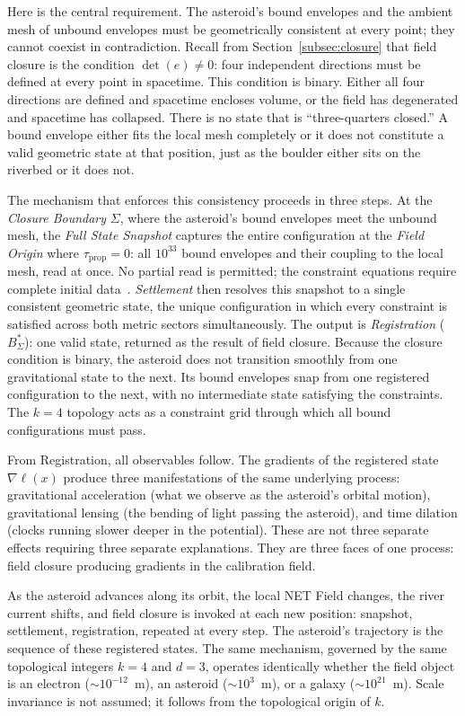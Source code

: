\documentclass[aps,prd,preprint,superscriptaddress,showpacs,preprintnumbers,amsmath,amssymb,nofootinbib]{revtex4-2}
\begin{document}
Here is the central requirement. The asteroid's bound envelopes and the ambient mesh of unbound envelopes must be geometrically consistent at every point; they cannot coexist in contradiction. Recall from Section~\ref{subsec:closure} that field closure is the condition $\det(e) \neq 0$: four independent directions must be defined at every point in spacetime. This condition is binary. Either all four directions are defined and spacetime encloses volume, or the field has degenerated and spacetime has collapsed. There is no state that is ``three-quarters closed.'' A bound envelope either fits the local mesh completely or it does not constitute a valid geometric state at that position, just as the boulder either sits on the riverbed or it does not.

The mechanism that enforces this consistency proceeds in three steps. At the \emph{Closure Boundary} $\Sigma$, where the asteroid's bound envelopes meet the unbound mesh, the \emph{Full State Snapshot} captures the entire configuration at the \emph{Field Origin} where $\tau_{\text{prop}} = 0$: all $10^{33}$ bound envelopes and their coupling to the local mesh, read at once. No partial read is permitted; the constraint equations require complete initial data~\cite{choquetbruhat1952}. \emph{Settlement} then resolves this snapshot to a single consistent geometric state, the unique configuration in which every constraint is satisfied across both metric sectors simultaneously. The output is \emph{Registration} ($B^*_\Sigma$): one valid state, returned as the result of field closure. Because the closure condition is binary, the asteroid does not transition smoothly from one gravitational state to the next. Its bound envelopes snap from one registered configuration to the next, with no intermediate state satisfying the constraints. The $k = 4$ topology acts as a constraint grid through which all bound configurations must pass.

From Registration, all observables follow. The gradients of the registered state $\nabla\ell(x)$ produce three manifestations of the same underlying process: gravitational acceleration (what we observe as the asteroid's orbital motion), gravitational lensing (the bending of light passing the asteroid), and time dilation (clocks running slower deeper in the potential). These are not three separate effects requiring three separate explanations. They are three faces of one process: field closure producing gradients in the calibration field.

As the asteroid advances along its orbit, the local NET Field changes, the river current shifts, and field closure is invoked at each new position: snapshot, settlement, registration, repeated at every step. The asteroid's trajectory is the sequence of these registered states. The same mechanism, governed by the same topological integers $k = 4$ and $d = 3$, operates identically whether the field object is an electron ($\sim 10^{-12}$~m), an asteroid ($\sim 10^{3}$~m), or a galaxy ($\sim 10^{21}$~m). Scale invariance is not assumed; it follows from the topological origin of $k$.
\end{document}
